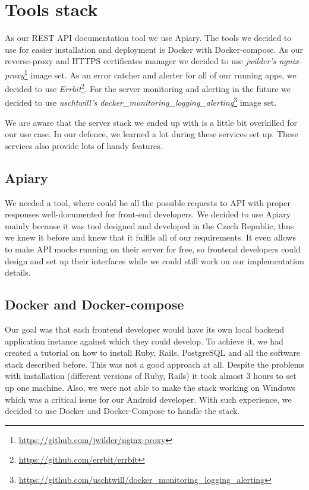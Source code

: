 \section{Tools stack}
As our REST API documentation tool we use Apiary.
The tools we decided to use for easier installation and deployment is Docker with Docker-compose. As our reverse-proxy and HTTPS certificates manager we decided to use \textit{jwilder's ngnix-proxy}\footnote{\url{https://github.com/jwilder/nginx-proxy}} image set. As an error catcher and alerter for all of our running apps, we decided to use \textit{Errbit}\footnote{\url{https://github.com/errbit/errbit}}. For the server monitoring and alerting in the future we decided to use \textit{uschtwill's docker\_monitoring\_logging\_alerting}\footnote{\url{https://github.com/uschtwill/docker_monitoring_logging_alerting}} image set.


We are aware that the server stack we ended up with is a little bit overkilled for our use case. In our defence, we learned a lot during these services set up. These services also provide lots of handy features.
\subsection{Apiary}
We needed a tool, where could be all the possible requests to API with proper responses well-documented for front-end developers. We decided to use Apiary mainly because it was tool designed and developed in the Czech Republic, thus we knew it before and knew that it fulfils all of our requirements. It even allows to make API mocks running on their server for free, so frontend developers could design and set up their interfaces while we could still work on our implementation details.
\subsection{Docker and Docker-compose}
Our goal was that each frontend developer would have its own local backend application instance against which they could develop. To achieve it, we had created a tutorial on how to install Ruby, Rails, PostgreSQL and all the software stack described before. This was not a good approach at all. Despite the problems with installation (different versions of Ruby, Rails) it took almost 3 hours to set up one machine. Also, we were not able to make the stack working on Windows which was a critical issue for our Android developer. With such experience, we decided to use Docker and Docker-Compose to handle the stack.

